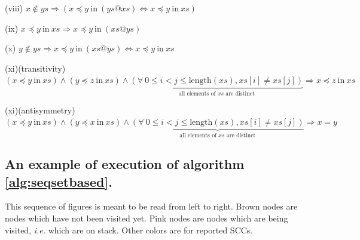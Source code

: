 \documentclass[a4 paper, 12pt]{article}
\theoremstyle{definition}
\begin{document}
{\begin{flushleft}
    (viii)
    $x \notin ys \Longrightarrow (x \preceq y~\text{in}~(ys @ xs) \Longleftrightarrow x \preceq y~\text{in}~xs)$
\end{flushleft}

\begin{flushleft}
    (ix)
    $x \preceq y~\text{in}~xs \Longrightarrow x \preceq y~\text{in}~(xs @ ys)$
\end{flushleft}

\begin{flushleft}
    (x)
    $y \notin ys \Longrightarrow x \preceq y~\text{in}~(xs @ ys) \Longleftrightarrow x \preceq y~\text{in}~xs$
\end{flushleft}

\begin{flushleft}
    (xi)(transitivity)
    $(x \preceq y~\text{in}~xs) \wedge (y \preceq z~\text{in}~xs) \wedge \underset{\text{all elements of $xs$ are distinct}}{\underbrace{(\forall~0 \leq i < j \leq \text{length}(xs), xs[i] \neq xs[j])}} \Longrightarrow x \preceq z~\text{in}~xs$
\end{flushleft}

\begin{flushleft}
    (xi)(antisymmetry)
    $(x \preceq y~\text{in}~xs) \wedge (y \preceq x~\text{in}~xs) \wedge \underset{\text{all elements of $xs$ are distinct}}{\underbrace{(\forall~0 \leq i < j \leq \text{length}(xs), xs[i] \neq xs[j])}} \Longrightarrow x = y$
\end{flushleft}

\subsection{An example of execution of algorithm \ref{alg:seqsetbased}.}\label{appendix:exec_ex}
This sequence of figures is meant to be read from left to right. Brown nodes are nodes which have not been visited yet. Pink nodes are nodes which are being visited, \textit{i.e.} which are on stack. Other colors are for reported SCCs.\\

}
\end{document}
